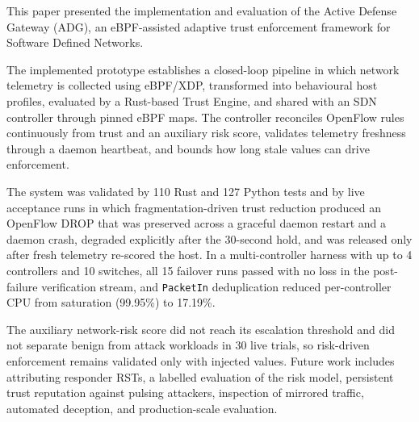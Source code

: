 \documentclass[conference]{IEEEtran}
\begin{document}
This paper presented the implementation and evaluation of the Active Defense Gateway (ADG), an eBPF-assisted adaptive trust enforcement framework for Software Defined Networks.

The implemented prototype establishes a closed-loop pipeline in which network telemetry is collected using eBPF/XDP, transformed into behavioural host profiles, evaluated by a Rust-based Trust Engine, and shared with an SDN controller through pinned eBPF maps. The controller reconciles OpenFlow rules continuously from trust and an auxiliary risk score, validates telemetry freshness through a daemon heartbeat, and bounds how long stale values can drive enforcement.

The system was validated by 110 Rust and 127 Python tests and by live acceptance runs in which fragmentation-driven trust reduction produced an OpenFlow DROP that was preserved across a graceful daemon restart and a daemon crash, degraded explicitly after the 30-second hold, and was released only after fresh telemetry re-scored the host. In a multi-controller harness with up to 4 controllers and 10 switches, all 15 failover runs passed with no loss in the post-failure verification stream, and \texttt{PacketIn} deduplication reduced per-controller CPU from saturation (99.95\%) to 17.19\%.

The auxiliary network-risk score did not reach its escalation threshold and did not separate benign from attack workloads in 30 live trials, so risk-driven enforcement remains validated only with injected values. Future work includes attributing responder RSTs, a labelled evaluation of the risk model, persistent trust reputation against pulsing attackers, inspection of mirrored traffic, automated deception, and production-scale evaluation.

\end{document}
